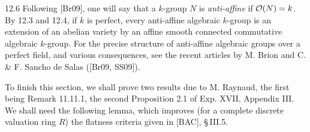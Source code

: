 \begin{remark}{12.6}\label{VIB.12.6}
Following [Br09], one will say that a $k$-group $N$ is \emph{anti-affine} if $\mathcal{O}(N)=k$. By 12.3 and 12.4, if $k$ is perfect, every anti-affine algebraic $k$-group is an extension of an abelian variety by an affine smooth connected commutative algebraic $k$-group. For the precise structure of anti-affine algebraic groups over a perfect field, and various consequences, see the recent articles by M. Brion and C. \& F. Sancho de Salas ([Br09, SS09]).
\end{remark}
To finish this section, we shall prove two results due to M. Raynaud, the first being Remark 11.11.1, the second Proposition 2.1 of Exp. XVII, Appendix III. We shall need the following lemma, which improves (for a complete discrete valuation ring $R$) the flatness criteria given in [BAC], \S\,III.5.


